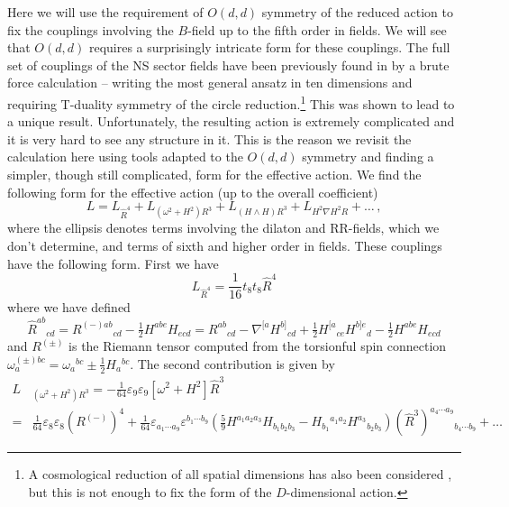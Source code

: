 \documentclass[a4paper,11pt]{article}
\begin{document}
Here we will use the requirement of $O(d,d)$ symmetry of the reduced action to fix the couplings involving the $B$-field up to the fifth order in fields. We will see that $O(d,d)$ requires a surprisingly intricate form for these couplings. The full set of couplings of the NS sector fields have been previously found in \cite{Garousi:2020mqn,Garousi:2020gio} by a brute force calculation -- writing the most general ansatz in ten dimensions and requiring T-duality symmetry of the circle reduction.\footnote{A cosmological reduction of all spatial dimensions has also been considered \cite{Codina:2020kvj,Codina:2021cxh,David:2021jqn}, but this is not enough to fix the form of the $D$-dimensional action.} This was shown to lead to a unique result. Unfortunately, the resulting action is extremely complicated and it is very hard to see any structure in it. This is the reason we revisit the calculation here using tools adapted to the $O(d,d)$ symmetry and finding a simpler, though still complicated, form for the effective action. We find the following form for the effective action (up to the overall coefficient)
\begin{equation}
L=L_{\hat R^4}+L_{(\omega^2+H^2)R^3}+L_{(H\wedge H)R^3}+L_{H^2\nabla H^2R}+\ldots\,,
\end{equation}
where the ellipsis denotes terms involving the dilaton and RR-fields, which we don't determine, and terms of sixth and higher order in fields. These couplings have the following form. First we have
\begin{equation}
L_{\hat R^4}=\frac{1}{16}t_8t_8\hat R^4
\end{equation}
where we have defined
\begin{equation}
\hat R^{ab}{}_{cd}=R^{(-)ab}{}_{cd}-\tfrac12H^{abe}H_{ecd}=R^{ab}{}_{cd}
-\nabla^{[a}H^{b]}{}_{cd}
+\tfrac12H^{[a}{}_{ce}H^{b]e}{}_{d}
-\tfrac12H^{abe}H_{ecd}
\end{equation}
and $R^{(\pm)}$ is the Riemann tensor computed from the torsionful spin connection $\omega_a^{(\pm)bc}=\omega_a{}^{bc}\pm\frac12H_a{}^{bc}$. The second contribution is given by
\begin{equation}
\begin{aligned}
L&_{(\omega^2+H^2)R^3}
=
-\frac1{64}\varepsilon_9\varepsilon_9[\omega^2+H^2]\hat R^3
\\
=&
\frac1{64}\varepsilon_8\varepsilon_8(R^{(-)})^4
+\frac1{64}\varepsilon_{a_1\cdots a_9}\varepsilon^{b_1\cdots b_9}\left(\tfrac{5}{9}H^{a_1a_2a_3}H_{b_1b_2b_3}-H_{b_1}{}^{a_1a_2}H^{a_3}{}_{b_2b_3}\right)\left(\hat R^3\right)^{a_4\cdots a_9}{}_{b_4\cdots b_9}
+\ldots
\end{aligned}
\label{eq:eeR4}
\end{equation}
\end{document}
